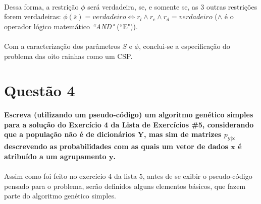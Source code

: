 \documentclass{report}
\begin{document}
\begin{itemize}
\begin{itemize}
	\end{itemize}
	
	\paragraph{} Dessa forma, a restrição $\phi$ será verdadeira, se, e somente se, as 3 outras restrições forem verdadeiras: $\phi(\overline{s}) = verdadeiro \iff r_l \wedge r_c \wedge r_d = verdadeiro$ ($\wedge$ é o operador lógico matemático \textit{``AND"} (``E")).\\
	 
\end{itemize}

\paragraph{} Com a caracterização dos parâmetros $S$ e $\phi$, conclui-se a especificação do problema das oito rainhas como um CSP.\\

\section*{Questão 4}

\textbf{Escreva (utilizando um pseudo-código) um algoritmo genético simples para a solução do Exercício 4 da Lista de Exercícios \#5, considerando que a população não é de dicionários $\mathbf{Y}$, mas sim de matrizes $p_{\mathbf{y}|\mathbf{x}}$ descrevendo as probabilidades com as quais um vetor de dados $\mathbf{x}$ é atribuído a um agrupamento $\mathbf{y}$.}\\

\paragraph{} \paragraph{} Assim como foi feito no exercício 4 da lista 5, antes de se exibir o pseudo-código pensado para o problema, serão definidos alguns elementos básicos, que fazem parte do algoritmo genético simples.\\
\end{document}
